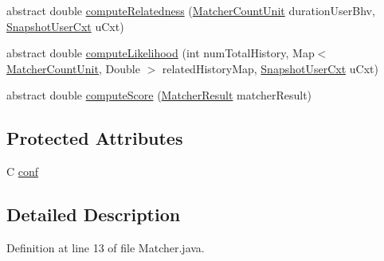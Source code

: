 \begin{DoxyCompactItemize}
\item 
abstract double \hyperlink{classlab_1_1davidahn_1_1appshuttle_1_1predict_1_1matcher_1_1_matcher_3_01_c_01extends_01_base_matcher_conf_01_4_aee6a1b04ed397379db0d30a32a1f3e6d}{compute\-Relatedness} (\hyperlink{classlab_1_1davidahn_1_1appshuttle_1_1predict_1_1matcher_1_1_matcher_count_unit}{\-Matcher\-Count\-Unit} duration\-User\-Bhv, \hyperlink{classlab_1_1davidahn_1_1appshuttle_1_1collect_1_1_snapshot_user_cxt}{\-Snapshot\-User\-Cxt} u\-Cxt)
\item 
abstract double \hyperlink{classlab_1_1davidahn_1_1appshuttle_1_1predict_1_1matcher_1_1_matcher_3_01_c_01extends_01_base_matcher_conf_01_4_a031ed7e2138ac681d5c53ade864d2236}{compute\-Likelihood} (int num\-Total\-History, \-Map$<$ \hyperlink{classlab_1_1davidahn_1_1appshuttle_1_1predict_1_1matcher_1_1_matcher_count_unit}{\-Matcher\-Count\-Unit}, \-Double $>$ related\-History\-Map, \hyperlink{classlab_1_1davidahn_1_1appshuttle_1_1collect_1_1_snapshot_user_cxt}{\-Snapshot\-User\-Cxt} u\-Cxt)
\item 
abstract double \hyperlink{classlab_1_1davidahn_1_1appshuttle_1_1predict_1_1matcher_1_1_matcher_3_01_c_01extends_01_base_matcher_conf_01_4_a5834c9843f3cf85c8b9e12b69015393b}{compute\-Score} (\hyperlink{classlab_1_1davidahn_1_1appshuttle_1_1predict_1_1matcher_1_1_matcher_result}{\-Matcher\-Result} matcher\-Result)
\end{DoxyCompactItemize}
\subsection*{\-Protected \-Attributes}
\begin{DoxyCompactItemize}
\item 
\-C \hyperlink{classlab_1_1davidahn_1_1appshuttle_1_1predict_1_1matcher_1_1_matcher_3_01_c_01extends_01_base_matcher_conf_01_4_a9efef0213a9c667fc2c0fdc859c73cd2}{conf}
\end{DoxyCompactItemize}


\subsection{\-Detailed \-Description}


\-Definition at line 13 of file \-Matcher.\-java.



